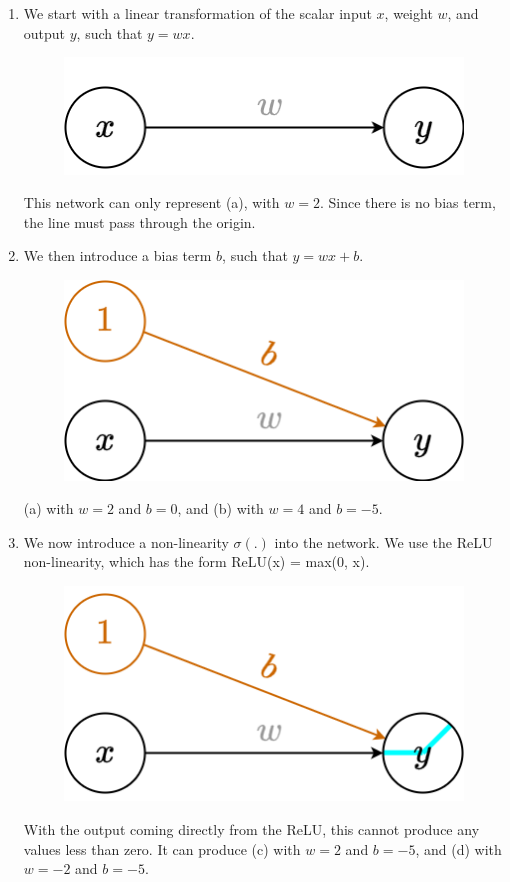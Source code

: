 \documentclass[11pt, a4paper]{article}
\begin{document}
\begin{enumerate}
    \item We start with a linear transformation of the scalar input $x$, weight
$w$, and output $y$, such that $y = wx$.
    \begin{figure}[h!]
    \centering
    \includegraphics[width=.4\linewidth]{figures/linearnet.png}
\end{figure}

    \begin{solution}
        This network can only represent (a), with $w = 2$. Since there is no bias term, the line must pass through the origin.
    \end{solution}
    
    \item We then introduce a bias term $b$, such that $y = wx+b$.
    \begin{figure}[h!]
    \centering
    \includegraphics[width=.4\linewidth]{figures/affinenet.png}
\end{figure}

    \begin{solution}
        (a) with $w = 2$ and $b = 0$, and (b) with $w = 4$ and $b = -5$.
    \end{solution}
    
    \item We now introduce a non-linearity $\sigma (.)$ into the network. We use the ReLU non-linearity, which has the form ReLU(x) = max(0, x).
    \begin{figure}[h!]
    \centering
    \includegraphics[width=.4\linewidth]{figures/onerelu.png}
\end{figure}

    \begin{solution}
        With the output coming directly from the ReLU, this cannot produce any values less than zero. It can produce (c) with $w = 2$ and $b = -5$, and (d) with $w = -2$ and $b = -5$.
    \end{solution}
    

\end{enumerate}
\end{document}
